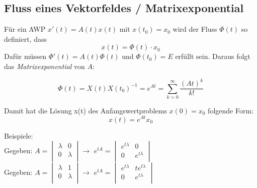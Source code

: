 \subsection{Fluss eines Vektorfeldes / Matrixexponential}
Für ein AWP $x'(t) = A(t) x(t)$ mit $x(t_0)=x_0$ wird der Fluss $\Phi(t)$ so definiert, dass 
\[ x(t) = \Phi(t) \cdot x_0 \]
Dafür müssen $\Phi'(t) = A(t)\Phi(t)$ und $\Phi(t_0) = E$ erfüllt sein.
Daraus folgt das \emph{Matrixexponential} von $A$:

\[
    \Phi(t) = X(t)X(t_0)^{-1} = e^{At} = \sum\limits_{k=0}^{\infty}\frac{(At)^k}{k!}
\]

Damit hat die Lösung x(t) des Anfangswertproblems $x(0) = x_0$ folgende Form: 
\[
    x(t) = e^{At}x_0
\]


Beispiele:\\
Gegeben: $A = 	\begin{vmatrix} 
	        		\lambda & 0\\ 
	        		0 & \lambda\\   
				\end{vmatrix} 
				\rightarrow$ 
$e^{tA} = \begin{vmatrix} 
	        		e^{t\lambda} & 0\\ 
	        		0 & e^{t\lambda}\\   
				\end{vmatrix}$\\
Gegeben: $A = 	\begin{vmatrix} 
	        		\lambda & 1\\ 
	        		0 & \lambda\\   
				\end{vmatrix} 
				\rightarrow$ 
$e^{tA} = \begin{vmatrix} 
	        		e^{t\lambda} & te^{t\lambda}\\ 
	        		0 & e^{t\lambda}\\   
				\end{vmatrix}$\\
				
